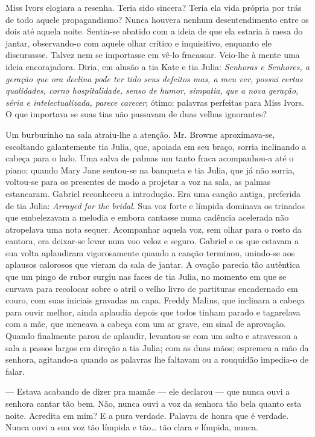 Miss Ivors elogiara a resenha. Teria sido sincera? Teria ela vida
própria por trás de todo aquele propagandismo? Nunca houvera nenhum
desentendimento entre os dois até aquela noite. Sentia-se abatido com
a ideia de que ela estaria à mesa do jantar, observando-o com aquele
olhar crítico e inquisitivo, enquanto ele discursasse. Talvez nem se
importasse em vê-lo fracassar. Veio-lhe à mente uma ideia
encorajadora. Diria, em alusão a tia Kate e tia Julia: \textit{Senhoras e
Senhores, a geração que ora declina pode ter tido seus defeitos mas, a
meu ver, possui certas qualidades, corno hospitalidade, senso de
humor, simpatia, que a nova geração, séria e intelectualizada, parece
carecer}; ótimo: palavras perfeitas para Miss Ivors. O que importava se
suas tias não passavam de duas velhas ignorantes?

Um burburinho na sala atraiu-lhe a atenção. Mr. Browne
aproximava-se, escoltando galantemente tia Julia, que, apoiada em
seu braço, sorria inclinando a cabeça para o lado. Uma salva de palmas
um tanto fraca acompanhou-a até o piano; quando Mary Jane sentou-se na
banqueta e tia Julia, que já não sorria, voltou-se para os presentes
de modo a projetar a voz na sala, as palmas estancaram. Gabriel
reconheceu a introdução. Era uma canção antiga, preferida de tia
Julia: \textit{Arrayed for the bridal}. Sua voz forte e límpida dominava os
trinados que embelezavam a melodia e embora cantasse numa cadência
acelerada não atropelava uma nota sequer. Acompanhar aquela voz, sem
olhar para o rosto da cantora, era deixar-se levar num voo veloz e
seguro. Gabriel e os que estavam a sua volta aplaudiram vigorosamente
quando a canção terminou, unindo-se aos aplausos calorosos que vieram
da sala de jantar. A ovação parecia tão autêntica que um pingo de
rubor surgiu nas faces de tia Julia, no momento em que se curvava para
recolocar sobre o atril o velho livro de partituras encadernado em
couro, com suas iniciais gravadas na capa. Freddy Malins, que
inclinara a cabeça para ouvir melhor, ainda aplaudia depois que todos
tinham parado e tagarelava com a mãe, que meneava a cabeça com um ar
grave, em sinal de aprovação. Quando finalmente parou de aplaudir,
levantou-se com um salto e atravessou a sala a passos largos em
direção a tia Julia; com as duas mãos; espremeu a mão da senhora,
agitando-a quando as palavras lhe faltavam ou a rouquidão impedia-o de
falar.

--- Estava acabando de dizer pra mamãe --- ele declarou --- que nunca
ouvi a senhora cantar tão bem. Não, nunca ouvi a voz da senhora tão
bela quanto esta noite. Acredita em mim? E a pura verdade. Palavra de
honra que é verdade. Nunca ouvi a sua voz tão límpida e tão\ldots{} tão
clara e límpida, nunca.

